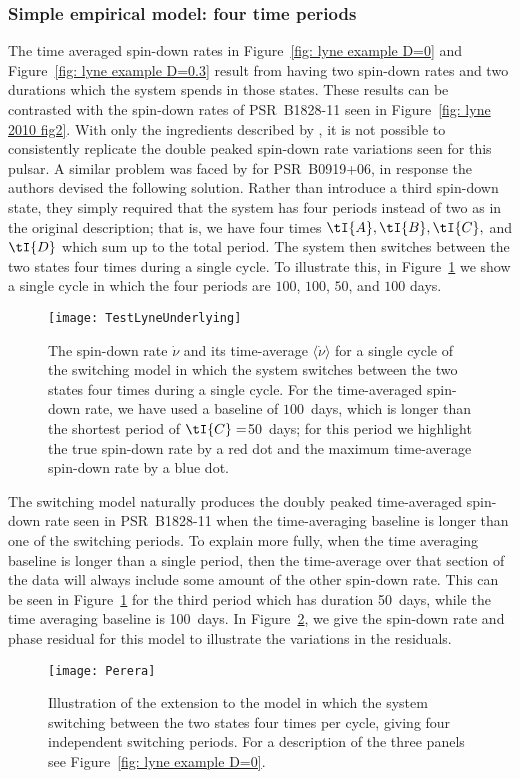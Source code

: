 \subsubsection{Simple empirical model: four time periods} 

The time averaged spin-down rates in Figure~\ref{fig: lyne example D=0} and
Figure~\ref{fig: lyne example D=0.3} result from having two spin-down rates and
two durations which the system spends in those states. These results can be
contrasted with the spin-down rates of PSR~B1828-11 seen in Figure~\ref{fig: lyne
2010 fig2}.  With only the ingredients described by \citet{Lyne2010}, it is not
possible to consistently replicate the double peaked spin-down rate variations
seen for this pulsar. A similar problem was faced by \citet{Perera2014} for
PSR~B0919+06, in response the authors devised the following solution. Rather
than introduce a third spin-down state, they simply required that the system
has four periods instead of two as in the original \citet{Lyne2010}
description; that is, we have four times $\tI{A}, \tI{B}, \tI{C},$ and $\tI{D}$
which sum up to the total period.
The system then switches between the two states four times during
a single cycle.  To illustrate this, in Figure~\ref{fig: test lyne underlying} we
show a single cycle in which the four periods are $100$, $100$, $50$, and $100$
days.
\begin{figure}[htb]
    \centering
    \texttt{[image: TestLyneUnderlying]}
    \caption{The spin-down rate $\dot{\nu}$ and its time-average $\langle\dot{\nu}\rangle$
    for a single cycle of the \citet{Perera2014} switching model in which the
    system switches between the two states four times during a single cycle.
    For the time-averaged spin-down rate, we have used a baseline of $100$~days,
    which is longer than the shortest period of $\tI{C}=$50~days; for this period we
    highlight the true spin-down rate by a red dot and the maximum time-average
    spin-down rate by a blue dot.}
    \label{fig: test lyne underlying}
\end{figure}

The \citet{Perera2014} switching model naturally produces the doubly peaked
time-averaged spin-down rate seen in PSR~B1828-11 when the time-averaging baseline is longer
than one of the switching periods. To explain more fully, when the time
averaging baseline is longer than a single period, then the time-average over
that section of the data will always include some amount of the other spin-down
rate. This can be seen in Figure~\ref{fig: test lyne underlying} for the third
period which has duration 50~days, while the time averaging baseline is
100~days. In Figure~\ref{fig: perera example}, we give the spin-down rate and
phase residual for this model to illustrate the variations in the residuals.
\begin{figure}[htb]
    \centering
    \texttt{[image: Perera]}
    \caption{Illustration of the \citet{Perera2014} extension to the
    \citet{Lyne2010} model in which the system switching between the two states
    four times per cycle, giving four independent switching periods. For a description
    of the three panels see Figure~\ref{fig: lyne example D=0}.}
    \label{fig: perera example}
\end{figure}

